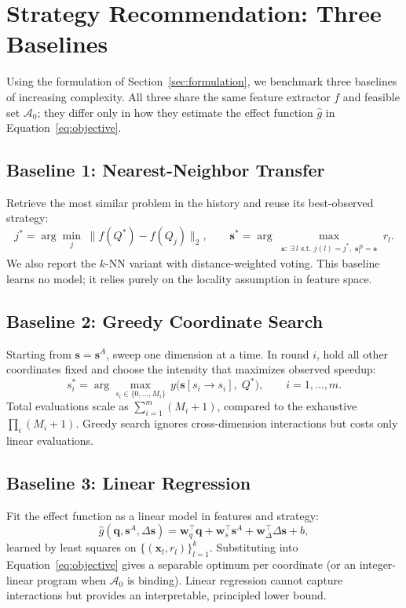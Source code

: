 \documentclass{article}
\begin{document}
\section{Strategy Recommendation: Three Baselines}
\label{sec:strategy}

Using the formulation of Section~\ref{sec:formulation}, we benchmark
three baselines of increasing complexity. All three share the same
feature extractor $f$ and feasible set $\mathcal{A}_0$; they differ
only in how they estimate the effect function $\hat{g}$ in
Equation~\eqref{eq:objective}.

\subsection{Baseline 1: Nearest-Neighbor Transfer}
\label{sec:bl1}
Retrieve the most similar problem in the history and reuse its
best-observed strategy:
\begin{equation}
j^* = \arg\min_{j}\;\bigl\lVert f(Q^*) - f(Q_j)\bigr\rVert_2,
\qquad
\mathbf{s}^* = \arg\max_{\substack{\mathbf{s}:\;\exists\,l \text{ s.t. } j(l)=j^*,\; \mathbf{s}_l^B = \mathbf{s}}} r_l.
\label{eq:nn}
\end{equation}
We also report the $k$-NN variant with distance-weighted voting. This
baseline learns no model; it relies purely on the locality assumption
in feature space.

\subsection{Baseline 2: Greedy Coordinate Search}
\label{sec:bl2}
Starting from $\mathbf{s} = \mathbf{s}^A$, sweep one dimension at a
time. In round $i$, hold all other coordinates fixed and choose the
intensity that maximizes observed speedup:
\begin{equation}
s_i^* = \arg\max_{s_i \in \{0,\ldots,M_i\}}\,
  y\bigl(\mathbf{s}[s_i \!\to\! s_i],\; Q^*\bigr),
  \qquad i = 1, \ldots, m.
\label{eq:greedy}
\end{equation}
Total evaluations scale as $\sum_{i=1}^{m}(M_i + 1)$, compared to the
exhaustive $\prod_i(M_i+1)$. Greedy search ignores cross-dimension
interactions but costs only linear evaluations.

\subsection{Baseline 3: Linear Regression}
\label{sec:bl3}
Fit the effect function as a linear model in features and strategy:
\begin{equation}
\hat{g}(\mathbf{q}, \mathbf{s}^A, \Delta\mathbf{s})
  = \mathbf{w}_q^{\top}\mathbf{q}
  + \mathbf{w}_s^{\top}\mathbf{s}^A
  + \mathbf{w}_\Delta^{\top}\Delta\mathbf{s} + b,
\label{eq:linreg}
\end{equation}
learned by least squares on $\{(\mathbf{x}_l, r_l)\}_{l=1}^{k}$.
Substituting into Equation~\eqref{eq:objective} gives a separable
optimum per coordinate (or an integer-linear program when
$\mathcal{A}_0$ is binding). Linear regression cannot capture
interactions but provides an interpretable, principled lower bound.
\end{document}
